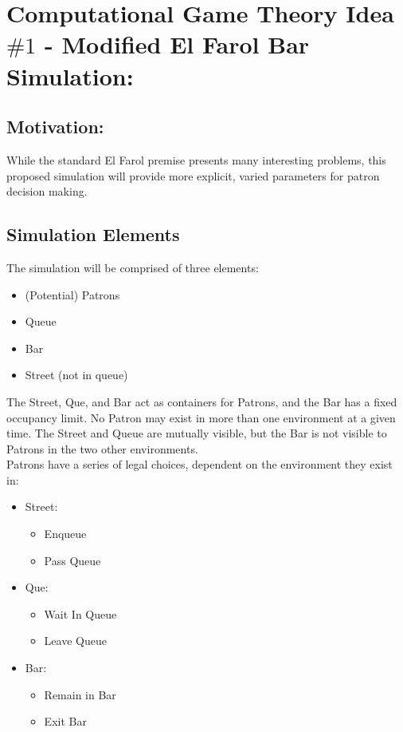 \documentclass[10pt]{article}
\begin{document}
\section{Computational Game Theory Idea $\#1$ - Modified El Farol Bar Simulation:}

\subsection{Motivation:} 
While the standard El Farol premise presents many interesting problems, this proposed simulation will provide more explicit, varied parameters for patron decision making.
\subsection{Simulation Elements}
The simulation will be comprised of three elements:
\begin{itemize}
\item (Potential) Patrons
\item Queue
\item Bar
\item Street (not in queue)
\end{itemize}

The Street, Que, and Bar act as containers for Patrons, and the Bar has a fixed occupancy limit. No Patron may exist in more than one environment at a given time. The Street and Queue are mutually visible, but the Bar is not visible to Patrons in the two other environments. \\
Patrons have a series of legal choices, dependent on the environment they exist in:
\begin{itemize}
\item Street:
\begin{itemize}
\item Enqueue
\item Pass Queue
\end{itemize}
\item Que:
\begin{itemize}
\item Wait In Queue
\item Leave Queue
\end{itemize}
\item Bar:
\begin{itemize}
\item Remain in Bar
\item Exit Bar
\end{itemize}
\end{itemize}
\end{document}

